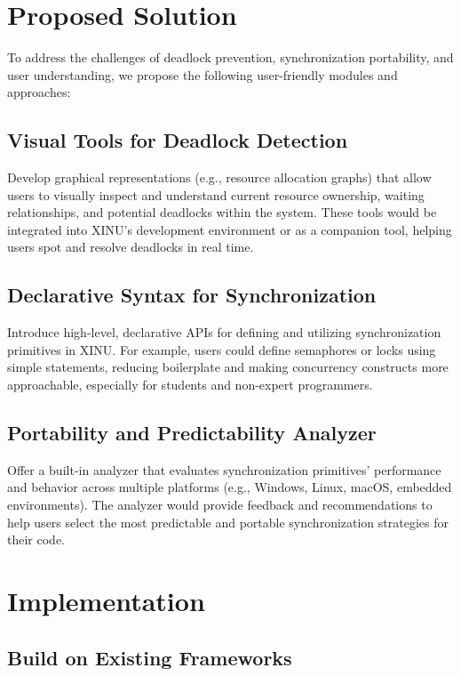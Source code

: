 \documentclass[conference,a4paper]{IEEEtran}
\begin{document}
\section{Proposed Solution}

To address the challenges of deadlock prevention, synchronization portability, and user understanding, we propose the following user-friendly modules and approaches:

\subsection{Visual Tools for Deadlock Detection}

Develop graphical representations (e.g., resource allocation graphs) that allow users to visually inspect and understand current resource ownership, waiting relationships, and potential deadlocks within the system. These tools would be integrated into XINU’s development environment or as a companion tool, helping users spot and resolve deadlocks in real time.

\subsection{Declarative Syntax for Synchronization}

Introduce high-level, declarative APIs for defining and utilizing synchronization primitives in XINU. For example, users could define semaphores or locks using simple statements, reducing boilerplate and making concurrency constructs more approachable, especially for students and non-expert programmers.

\subsection{Portability and Predictability Analyzer}

Offer a built-in analyzer that evaluates synchronization primitives’ performance and behavior across multiple platforms (e.g., Windows, Linux, macOS, embedded environments). The analyzer would provide feedback and recommendations to help users select the most predictable and portable synchronization strategies for their code.

\section{Implementation}

\subsection{Build on Existing Frameworks}
\end{document}

